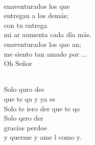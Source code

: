 \begin{cancion}
\jump\\
	enaventurados los que \\
	 entregan a los demás;\\
	con tu entrega \\
	mi ar aumenta cada día más.\\
	enaventurados los que an;\\
	 me siento tan amado por ...\\
	Oh Señor  \\\jump\\
	\begin{chorus}%
	Solo quro dec\\
	que te qu y ya es\\
	Solo te iero der que te qo\\
	Solo qero der\\
	gracias perdoe\\
	y querme y ame l como y.\\
	\end{chorus}%
	\jump\\
\end{cancion}%
